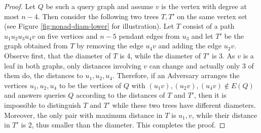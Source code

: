 \documentclass[12pt,a4paper]{amsart}
\theoremstyle{plain}
\theoremstyle{definition}
\begin{document}
\begin{proof}
    Let $Q$ be such a query graph and assume $v$ is the vertex with degree at most $n-4$. Then consider the following two trees $T,T'$ on the same vertex set (see Figure \ref{fig:nonad-diam-lower} for illustration). Let $T$ consist of a path $u_1u_2u_3u_4v$ on five vertices and $n-5$ pendant edges from $u_3$ and let $T'$ be the graph obtained from $T$ by removing the edge $u_4v$ and adding the edge $u_2v$. Observe first, that the diameter of $T$ is 4, while the diameter of $T'$ is 3. As $v$ is a leaf in both graphs, only distances involving $v$ can change and actually only 3 of them do, the distances to $u_1,u_2,u_4$. Therefore, if an Adversary arranges the vertices $u_1,u_2,u_4$ to be the vertices of $Q$ with $(u_1v),(u_2v),(u_4v)\notin E(Q)$ and answers queries $Q$ according to the distances of $T$ and $T'$, then it is impossible to distinguish $T$ and $T'$ while these two trees have different diameters. Moreover, the only pair with maximum distance in $T$ is $u_1,v$, while their distance in $T'$ is $2$, thus smaller than the diameter. This completes the proof.
\end{proof}
\end{document}
